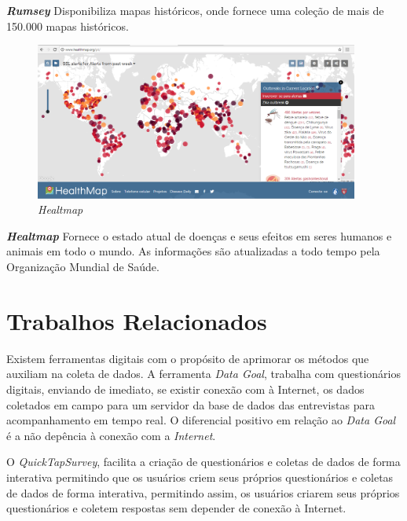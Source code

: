 \documentclass[
	12pt,				%
    oneside,			%
	a4paper,			%
	english,			%
	french,				%
	spanish,			%
	brazil,				%
	]{abntex2}
\begin{document}
\textit{\textbf{Rumsey}} Disponibiliza mapas históricos, onde fornece uma coleção de mais de 150.000 mapas históricos. 

\begin{figure} [H] 
\label{figura1} 
\caption{\textit{Healtmap}}
\includegraphics[width=0.95\textwidth]{healt.png} %
\end{figure}

\textit{\textbf{Healtmap}} Fornece o estado atual de doenças e seus efeitos em seres humanos e animais em todo o mundo. As informações são atualizadas a todo tempo pela Organização Mundial de Saúde.

\chapter{Trabalhos Relacionados}
Existem ferramentas digitais com o propósito de aprimorar os métodos que auxiliam na coleta de dados. A ferramenta \textit{Data Goal}, trabalha com questionários digitais, enviando de imediato, se existir conexão com à Internet, os dados coletados em campo para um servidor da base de dados das entrevistas para acompanhamento em tempo real. O diferencial positivo em relação ao \textit{Data Goal} é a não depência à conexão com a \textit{Internet}.

O \textit{QuickTapSurvey}, facilita a criação de questionários e coletas de dados de forma interativa permitindo que os usuários criem seus próprios questionários e coletas de dados de forma interativa, permitindo assim, os usuários criarem seus próprios questionários e coletem respostas sem depender de conexão à Internet.
\end{document}
